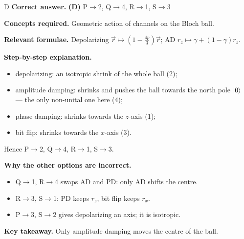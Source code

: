 \documentclass[11pt,a4paper]{article}
\newcommand{\qsep}{\par\vspace{2pt}{\color{black!15}\hrule}\vspace{4pt}}
\begin{document}
\begin{solbox}{D}
\textbf{\color{brand}Correct answer.} \textcolor{okgreen}{\textbf{(D)}} P$\to$2, Q$\to$4, R$\to$1, S$\to$3

\textbf{\color{brand}Concepts required.} Geometric action of channels on the Bloch ball.

\textbf{\color{brand}Relevant formulae.} Depolarizing $\vec r \mapsto (1 - \frac{4p}{3})\vec r$; AD $r_z \mapsto \gamma + (1-\gamma)r_z$.

\textbf{\color{brand}Step-by-step explanation.} \begin{itemize}\itemsep0pt
\item depolarizing: an isotropic shrink of the whole ball (2);
\item amplitude damping: shrinks and pushes the ball towards the north pole $\ket0$ --- the only non-unital one here (4);
\item phase damping: shrinks towards the $z$-axis (1);
\item bit flip: shrinks towards the $x$-axis (3).
\end{itemize}
Hence P$\to$2, Q$\to$4, R$\to$1, S$\to$3.

\textbf{\color{brand}Why the other options are incorrect.}
\begin{itemize}[leftmargin=2.4em, itemsep=1pt, topsep=2pt]
\item[\textbf{(A)}] Q$\to$1, R$\to$4 swaps AD and PD: only AD shifts the centre.
\item[\textbf{(B)}] R$\to$3, S$\to$1: PD keeps $r_z$, bit flip keeps $r_x$.
\item[\textbf{(C)}] P$\to$3, S$\to$2 gives depolarizing an axis; it is isotropic.
\end{itemize}
\textbf{\color{brand}Key takeaway.} Only amplitude damping moves the centre of the ball.
\end{solbox}
\qsep
\end{document}
